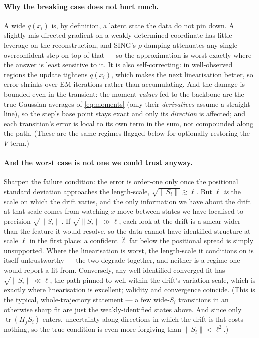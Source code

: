 \documentclass[11pt]{article}
\newcommand{\tr}{\operatorname{tr}}
\begin{document}
\paragraph{Why the breaking case does not hurt much.}
A wide $q(x_i)$ is, by definition, a latent state the data do not pin
down. A slightly mis-directed gradient on a weakly-determined coordinate
has little leverage on the reconstruction, and SING's $\rho$-damping
attenuates any single overconfident step on top of that --- so the
approximation is worst exactly where the answer is least sensitive to it.
It is also self-correcting: in well-observed regions the update tightens
$q(x_i)$, which makes the next linearisation better, so error shrinks over
EM iterations rather than accumulating. And the damage is bounded even
in the transient: the moment \emph{values} fed to the backbone are the
true Gaussian averages of \eqref{eq:moments} (only their \emph{derivatives}
assume a straight line), so the step's base point stays exact and only its
\emph{direction} is affected; and each transition's error is local to its
own term in the sum, not compounded along the path. (These are the same
regimes flagged below for optionally restoring the $V$ term.)

\paragraph{And the worst case is not one we could trust anyway.}
Sharpen the failure condition: the error is order-one only once the
positional standard deviation approaches the length-scale,
$\sqrt{\|S_i\|}\gtrsim\ell$. But $\ell$ \emph{is} the scale on which the
drift varies, and the only information we have about the drift at that
scale comes from watching $x$ move between states we have localised to
precision $\sqrt{\|S_i\|}$. If $\sqrt{\|S_i\|}\gg\ell$, each look at the
drift is a smear wider than the feature it would resolve, so the data
cannot have identified structure at scale $\ell$ in the first place: a
confident $\hat\ell$ far below the positional spread is simply
unsupported. Where the linearisation is worst, the length-scale it
conditions on is itself untrustworthy --- the two degrade together, and
neither is a regime one would report a fit from. Conversely, any
well-identified converged fit has $\sqrt{\|S_i\|}\ll\ell$, the path pinned
to well within the drift's variation scale, which is exactly where
linearisation is excellent; validity and convergence coincide. (This is
the typical, whole-trajectory statement --- a few wide-$S_i$ transitions
in an otherwise sharp fit are just the weakly-identified states above. And
since only $\tr(H_{\bar f}S_i)$ enters, uncertainty along directions in
which the drift is flat costs nothing, so the true condition is even more
forgiving than $\|S_i\|<\ell^2$.)
\end{document}
